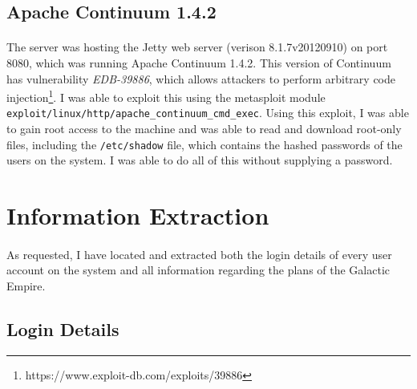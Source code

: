 \documentclass{article}
\begin{document}
\subsection{Apache Continuum 1.4.2}
\paragraph{}
The server was hosting the Jetty web server (verison 8.1.7v20120910) on port 8080, which was running Apache Continuum 1.4.2.
This version of Continuum has vulnerability \emph{EDB-39886}, which allows attackers to perform arbitrary code injection\footnote{https://www.exploit-db.com/exploits/39886}.
I was able to exploit this using the metasploit module \texttt{exploit/linux/http/apache\_continuum\_cmd\_exec}.
Using this exploit, I was able to gain root access to the machine and was able to read and download root-only files, including the \texttt{/etc/shadow} file, which contains the hashed passwords of the users on the system. 
I was able to do all of this without supplying a password.

\newpage

\section{Information Extraction}
\paragraph{}
As requested, I have located and extracted both the login details of every user account on the system and all information regarding the plans of the Galactic Empire.

\subsection{Login Details}
\end{document}
